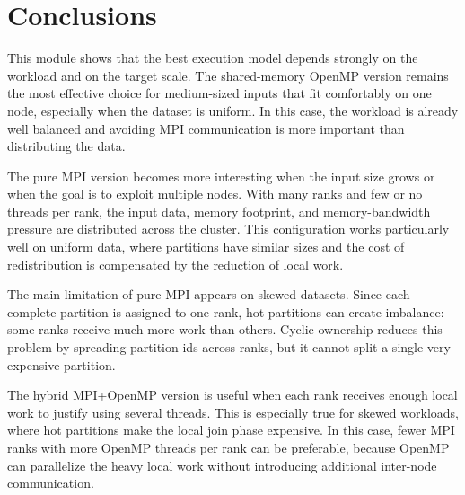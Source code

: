 \documentclass[11pt,a4paper]{article}
\begin{document}
\section{Conclusions}

This module shows that the best execution model depends strongly on the workload and on the target scale. The shared-memory OpenMP version remains the most effective choice for medium-sized inputs that fit comfortably on one node, especially when the dataset is uniform. In this case, the workload is already well balanced and avoiding MPI communication is more important than distributing the data.

The pure MPI version becomes more interesting when the input size grows or when the goal is to exploit multiple nodes. With many ranks and few or no threads per rank, the input data, memory footprint, and memory-bandwidth pressure are distributed across the cluster. This configuration works particularly well on uniform data, where partitions have similar sizes and the cost of redistribution is compensated by the reduction of local work.

The main limitation of pure MPI appears on skewed datasets. Since each complete partition is assigned to one rank, hot partitions can create imbalance: some ranks receive much more work than others. Cyclic ownership reduces this problem by spreading partition ids across ranks, but it cannot split a single very expensive partition.

The hybrid MPI+OpenMP version is useful when each rank receives enough local work to justify using several threads. This is especially true for skewed workloads, where hot partitions make the local join phase expensive. In this case, fewer MPI ranks with more OpenMP threads per rank can be preferable, because OpenMP can parallelize the heavy local work without introducing additional inter-node communication.
\end{document}
